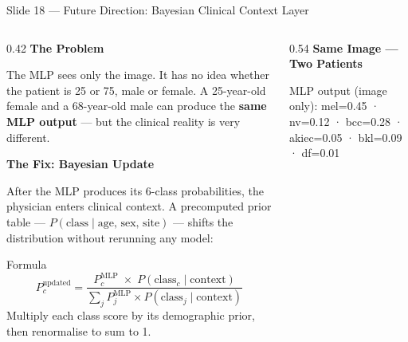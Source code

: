 \documentclass[aspectratio=169, 9pt]{beamer}
\begin{document}
\begin{frame}{Slide 18 --- Future Direction: Bayesian Clinical Context Layer}

  \begin{columns}[T]

    \begin{column}{0.42\textwidth}
      \textbf{\color{navyblue}The Problem}

      \vspace{0.2em}
      {\small
      The MLP sees only the image. It has no idea whether the
      patient is 25 or 75, male or female. A 25-year-old female
      and a 68-year-old male can produce the \textbf{same MLP
      output} --- but the clinical reality is very different.
      }

      \vspace{0.4em}
      \textbf{\color{navyblue}The Fix: Bayesian Update}

      \vspace{0.2em}
      {\small
      After the MLP produces its 6-class probabilities, the
      physician enters clinical context. A precomputed prior
      table --- $P(\text{class} \mid \text{age, sex, site})$
      --- shifts the distribution without rerunning any model:
      }

      \vspace{0.3em}
      \begin{block}{Formula}
        \small
        \[
          P_c^{\text{updated}} =
          \frac{P_c^{\text{MLP}} \;\times\; P(\text{class}_c \mid \text{context})}
               {\displaystyle\sum_j P_j^{\text{MLP}} \times P(\text{class}_j \mid \text{context})}
        \]
        {\scriptsize Multiply each class score by its demographic
        prior, then renormalise to sum to 1.}
      \end{block}
    \end{column}

    \begin{column}{0.54\textwidth}
      \textbf{\color{navyblue}Same Image --- Two Patients}

      \vspace{0.3em}
      {\scriptsize MLP output (image only):
      mel=0.45 · nv=0.12 · bcc=0.28 · akiec=0.05 · bkl=0.09 · df=0.01}


\end{column}
\end{columns}
\end{frame}
\end{document}
